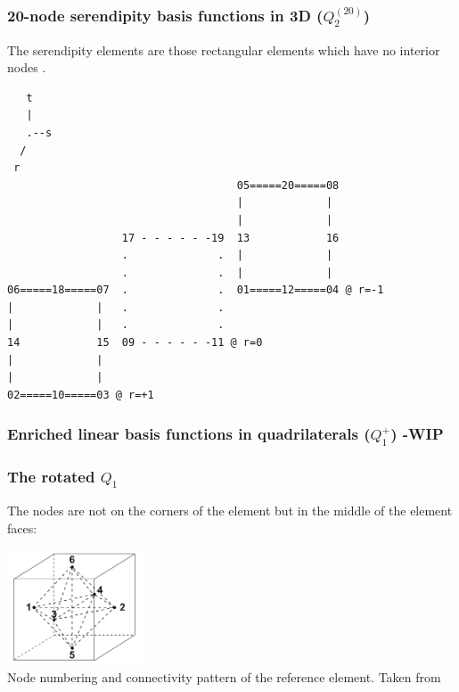 \subsubsection{20-node serendipity basis functions in 3D ($Q_2^{(20)}$)}
 

The serendipity elements are those rectangular elements which have no
interior nodes \cite[p91]{reddybook2}.

\begin{verbatim}
   t
   |
   .--s
  /
 r
                                    05=====20=====08 
                                    |             |  
                                    |             |  
                  17 - - - - - -19  13            16
                  .              .  |             |  
                  .              .  |             |  
06=====18=====07  .              .  01=====12=====04 @ r=-1
|             |   .              . 
|             |   .              .  
14            15  09 - - - - - -11 @ r=0
|             |   
|             |  
02=====10=====03 @ r=+1
\end{verbatim}



\subsubsection{Enriched linear basis functions in quadrilaterals ($Q_1^+$) -WIP} \label{ss:quadmini3D}




\subsubsection{The rotated $Q_1$} \label{ss:rq1}

The nodes are not on the corners of the element but in the middle of the
element faces:

\begin{center}
\includegraphics[width=4cm]{images/rannacherturek/elt3D}\\
{\captionfont Node numbering and connectivity pattern of the reference element. Taken from \cite{gekm08}}
\end{center}

